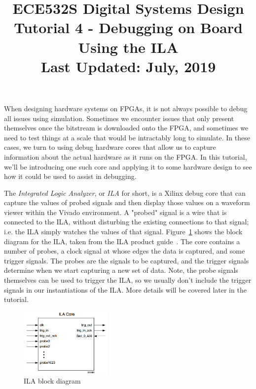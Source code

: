 \documentclass[11pt]{article}
\title{ECE532S Digital Systems Design \\ \vspace{0.4cm}
       \Large Tutorial 4 - Debugging on Board Using the ILA \\ \vspace{0.4cm}
       \small Last Updated: July, 2019}
\author{ }
\date{ }
\begin{document}
\maketitle
\vspace{-1cm}

When designing hardware systems on FPGAs, it is not always possible to debug all issues using simulation. Sometimes we encounter issues that only present themselves once the bitstream is downloaded onto the FPGA, and sometimes we need to test things at a scale that would be intractably long to simulate. In these cases, we turn to using debug hardware cores that allow us to capture information about the actual hardware as it runs on the FPGA. In this tutorial, we'll be introducing one such core and applying it to some hardware design to see how it could be used to assist in debugging.

The \textit{Integrated Logic Analyzer}, or \textit{ILA} for short, is a Xilinx debug core that can capture the values of probed signals and then display those values on a waveform viewer within the Vivado environment. A "probed" signal is a wire that is connected to the ILA, without disturbing the existing connections to that signal; i.e. the ILA simply watches the values of that signal. Figure~\ref{fig:ila} shows the block diagram for the ILA, taken from the ILA product guide~\cite{xilinx_ila}. The core contains a number of probes, a clock signal at whose edges the data is captured, and some trigger signals. The probes are the signals to be captured, and the trigger signals determine when we start capturing a new set of data. Note, the probe signals themselves can be used to trigger the ILA, so we usually don't include the trigger signals in our instantiations of the ILA. More details will be covered later in the tutorial.


\begin{figure}[!h]
    \centering
    \includegraphics[width=0.4\textwidth]{images/ila.png}
    \caption{ILA block diagram}
    \label{fig:ila}
\end{figure}
\end{document}
